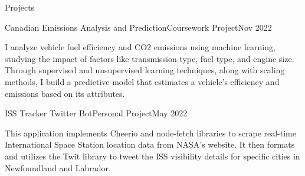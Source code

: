 \documentclass[]{Keenan-Nicholson-Resume}
\begin{document}
\begin{section}{Projects}
\begin{subsectionnobullet}{Canadian Emissions Analysis and Prediction}{Coursework Project}{Nov 2022}{}
    \item{I analyze vehicle fuel efficiency and CO2 emissions using machine learning, studying the impact of factors like transmission type, fuel type, and engine size. Through supervised and unsupervised learning techniques, along with scaling methods, I build a predictive model that estimates a vehicle's efficiency and emissions based on its attributes.}
\end{subsectionnobullet}

\begin{subsectionnobullet}{ISS Tracker Twitter Bot}{Personal Project}{May 2022}{}
    \item{This application implements Cheerio and node-fetch libraries to scrape real-time International Space Station location data from NASA's website. It then formats and utilizes the Twit library to tweet the ISS visibility details for specific cities in Newfoundland and Labrador.}
\end{subsectionnobullet}

\end{section}

\end{document}

